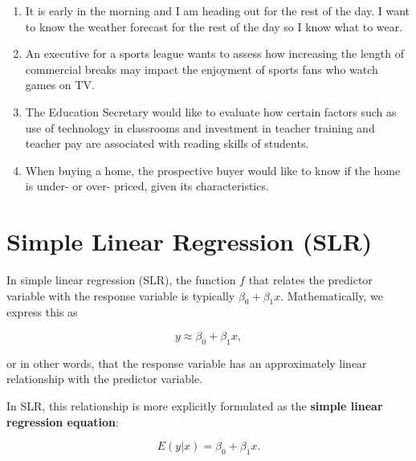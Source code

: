 \documentclass[
]{book}
\begin{document}
\begin{enumerate}
\def\labelenumi{\arabic{enumi}.}
\item
  It is early in the morning and I am heading out for the rest of the day. I want to know the weather forecast for the rest of the day so I know what to wear.
\item
  An executive for a sports league wants to assess how increasing the length of commercial breaks may impact the enjoyment of sports fans who watch games on TV.
\item
  The Education Secretary would like to evaluate how certain factors such as use of technology in classrooms and investment in teacher training and teacher pay are associated with reading skills of students.
\item
  When buying a home, the prospective buyer would like to know if the home is under- or over- priced, given its characteristics.
\end{enumerate}

\hypertarget{simple-linear-regression-slr}{%
\section{Simple Linear Regression (SLR)}\label{simple-linear-regression-slr}}

In simple linear regression (SLR), the function \(f\) that relates the predictor variable with the response variable is typically \(\beta_0 + \beta_1 x\). Mathematically, we express this as

\[
y \approx \beta_0 + \beta_1 x,
\]

or in other words, that the response variable has an approximately linear relationship with the predictor variable.

In SLR, this relationship is more explicitly formulated as the \textbf{simple linear regression equation}:

\begin{equation} 
E(y|x)=\beta_0+\beta_{1}x.
\label{eq:SLR}
\end{equation}
\end{document}
